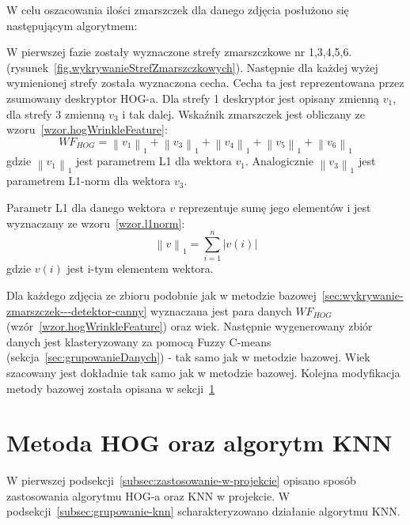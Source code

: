 \documentclass[a4paper,twoside,12pt]{book}
\begin{document}
    W celu oszacowania ilości zmarszczek dla danego zdjęcia posłużono się następującym algorytmem:

    W pierwszej fazie zostały wyznaczone strefy zmarszczkowe nr 1,3,4,5,6.
    (rysunek~\ref{fig.wykrywanieStrefZmarszczkowych}).
    Następnie dla każdej wyżej wymienionej strefy została wyznaczona cecha. Cecha ta jest reprezentowana przez
    zsumowany deskryptor HOG-a. Dla strefy 1 deskryptor jest opisany
    zmienną $v_{1}$, dla strefy 3 zmienną $v_{3}$ i tak dalej.
    Wskaźnik zmarszczek jest obliczany ze wzoru~\ref{wzor.hogWrinkleFeature}:
    \large
    \begin{equation}
        WF_{HOG} = \left \|v_{1}  \right \|_{1}+\left \|v_{3}  \right \|_{1}+\left \|v_{4}  \right \|_{1}+\left
        \|v_{5}  \right \|_{1}+\left \|v_{6}  \right \|_{1}
        \label{wzor.hogWrinkleFeature}
    \end{equation}
    \normalsize
    gdzie $\left \|v_{1}  \right \|_{1}$ jest parametrem L1 dla wektora $v_{1}$. Analogicznie $\left \|v_{3}
    \right \|_{1}$  jest parametrem L1-norm dla wektora $v_{3}$.

    Parametr L1 dla danego wektora $v$ reprezentuje sumę jego elementów i jest wyznaczany ze wzoru~\ref{wzor.l1norm}:
    \large
    \begin{equation}
        \left \|v  \right \|_{1} = \sum_{i=1}^{n}\left |v(i)  \right |
        \label{wzor.l1norm}
    \end{equation}
    \normalsize
    gdzie $v(i)$ jest i-tym elementem wektora.

    Dla każdego zdjęcia ze zbioru podobnie jak w metodzie bazowej~\ref{sec:wykrywanie-zmarszczek---detektor-canny}
    wyznaczana jest para danych $WF_{HOG}$ (wzór~\ref{wzor.hogWrinkleFeature}) oraz wiek. Następnie wygenerowany
    zbiór danych jest klasteryzowany za pomocą Fuzzy C-means (sekcja~\ref{sec:grupowanieDanych}) - tak samo jak w
    metodzie
    bazowej.
    Wiek szacowany jest dokładnie tak samo jak w metodzie bazowej.
    Kolejna modyfikacja metody bazowej została opisana w sekcji~\ref{sec:metoda-hog-oraz-algorytm-knn}
    \section{Metoda HOG oraz algorytm KNN}\label{sec:metoda-hog-oraz-algorytm-knn}
    W pierwszej podsekcji~\ref{subsec:zastosowanie-w-projekcie} opisano sposób zastosowania algorytmu HOG-a oraz KNN
    w projekcie.
    W podsekcji~\ref{subsec:grupowanie-knn} scharakteryzowano działanie algorytmu KNN.
\end{document}
